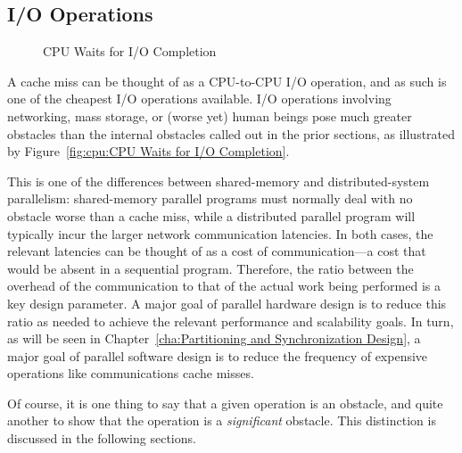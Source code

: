 \QuickQuizEnd

\subsection{I/O Operations}
\label{sec:cpu:I/O Operations}

\begin{figure}
\centering
{}
\caption{CPU Waits for I/O Completion}
\end{figure}

A cache miss can be thought of as a CPU-to-CPU I/O operation, and as
such is one of the cheapest I/O operations available.
I/O operations involving networking, mass storage, or (worse yet) human
beings pose much greater obstacles than the internal obstacles called
out in the prior sections,
as illustrated by
Figure~\ref{fig:cpu:CPU Waits for I/O Completion}.

This is one of the differences between shared-memory and distributed-system
parallelism: shared-memory parallel programs must normally deal with no
obstacle worse than a cache miss, while a distributed parallel program
will typically incur the larger network communication latencies.
In both cases, the relevant latencies can be thought of as a cost of
communication---a cost that would be absent in a sequential program.
Therefore, the ratio between the overhead of the communication to
that of the actual work being performed is a key design parameter.
A major goal of parallel hardware design is to reduce this ratio as
needed to achieve the relevant performance and scalability goals.
In turn, as will be seen in
Chapter~\ref{cha:Partitioning and Synchronization Design},
a major goal of parallel software design is to reduce the
frequency of expensive operations like communications cache misses.

Of course, it is one thing to say that a given operation is an obstacle,
and quite another to show that the operation is a \emph{significant}
obstacle.
This distinction is discussed in the following sections.
